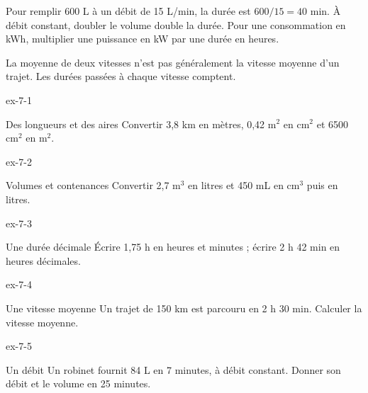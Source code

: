 \begin{savoirfaire}Pour remplir 600 L à un débit de 15 L/min, la durée est $600/15=40$ min. À débit constant, doubler le volume double la durée. Pour une consommation en kWh, multiplier une puissance en kW par une durée en heures.\end{savoirfaire}
\begin{attention}La moyenne de deux vitesses n’est pas généralement la vitesse moyenne d’un trajet. Les durées passées à chaque vitesse comptent.\end{attention}
\clearpage{}
\begin{blocLivre}{ex-7-1}\begin{exercice}[1]{Des longueurs et des aires}
Convertir 3,8 km en mètres, 0,42 m$^2$ en cm$^2$ et 6500 cm$^2$ en m$^2$.
\end{exercice}\end{blocLivre}
\begin{blocLivre}{ex-7-2}\begin{exercice}[1]{Volumes et contenances}
Convertir 2,7 m$^3$ en litres et 450 mL en cm$^3$ puis en litres.
\end{exercice}\end{blocLivre}
\begin{blocLivre}{ex-7-3}\begin{exercice}[1]{Une durée décimale}
Écrire 1,75 h en heures et minutes ; écrire 2 h 42 min en heures décimales.
\end{exercice}\end{blocLivre}
\begin{blocLivre}{ex-7-4}\begin{exercice}[1]{Une vitesse moyenne}
Un trajet de 150 km est parcouru en 2 h 30 min. Calculer la vitesse moyenne.
\end{exercice}\end{blocLivre}
\begin{blocLivre}{ex-7-5}\begin{exercice}[1]{Un débit}
Un robinet fournit 84 L en 7 minutes, à débit constant. Donner son débit et le volume en 25 minutes.
\end{exercice}\end{blocLivre}

